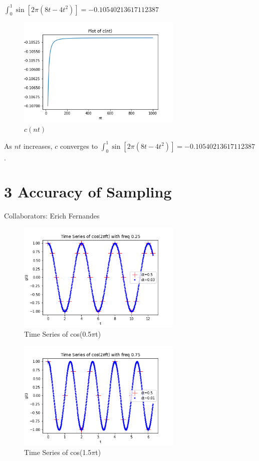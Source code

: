 \documentclass[12pt,a4paper]{article}
\begin{document}
$\int_0^1 \sin[2\pi(8t-4t^2)] = -0.10540213617112387$

\begin{figure}[H]
    \centering
    \includegraphics[width=0.7\textwidth]{fig3.png}
    \caption{$c(nt)$}
\end{figure}

As $nt$ increases, $c$ converges to $\int_0^1 \sin[2\pi(8t-4t^2)] = -0.10540213617112387$.

\newpage
\section*{3 Accuracy of Sampling}
Collaborators: Erich Fernandes
\begin{figure}[H]
    \centering
    \includegraphics[width=0.7\textwidth]{fig4.png}
    \caption{Time Series of cos(0.5$\pi$t)}
\end{figure}

\begin{figure}[H]
    \centering
    \includegraphics[width=0.7\textwidth]{fig5.png}
    \caption{Time Series of cos(1.5$\pi$t)}
\end{figure}
\end{document}
